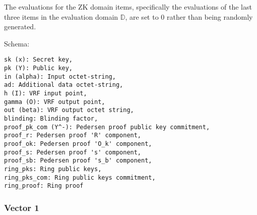 \documentclass[
]{article}
\begin{document}
The evaluations for the ZK domain items, specifically the evaluations of
the last three items in the evaluation domain \(\mathbb{D}\), are set to
0 rather than being randomly generated.

Schema:

\begin{verbatim}
sk (x): Secret key,
pk (Y): Public key,
in (alpha): Input octet-string,
ad: Additional data octet-string,
h (I): VRF input point,
gamma (O): VRF output point,
out (beta): VRF output octet string,
blinding: Blinding factor,
proof_pk_com (Y^-): Pedersen proof public key commitment,
proof_r: Pedersen proof 'R' component,
proof_ok: Pedersen proof 'O_k' component,
proof_s: Pedersen proof 's' component,
proof_sb: Pedersen proof 's_b' component,
ring_pks: Ring public keys,
ring_pks_com: Ring public keys commitment,
ring_proof: Ring proof
\end{verbatim}

\subsubsection{Vector 1}\label{vector-1-2}
\end{document}
